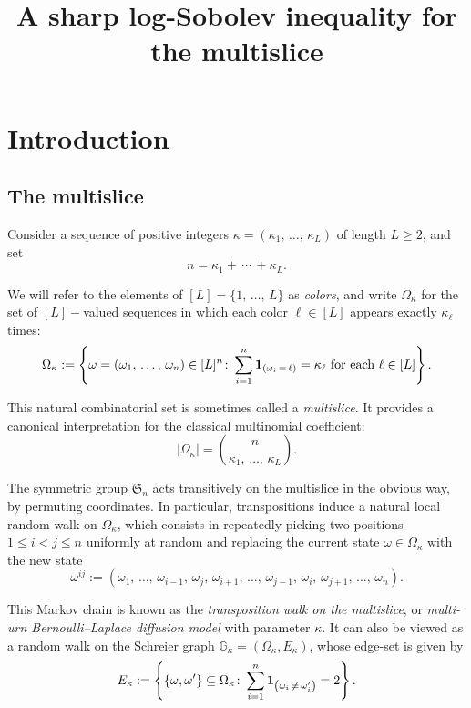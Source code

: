 \documentclass[AHL,Unicode,longabstracts,published]{cedram}
\title[A sharp log-Sobolev inequality for the multislice]{A sharp log-Sobolev inequality for the multislice}
\author[\initial{J.} \lastname{Salez}]{\firstname{Justin} \lastname{Salez}}
\newcommand{\GG}{\mathbb{G}}
\newcommand{\frkS}{\mathfrak{S}}
\newcommand{\bfun}{\bf 1}
\begin{document}
\maketitle

\section{Introduction}
\subsection{The multislice}
Consider a sequence of positive integers $\kappa=(\kappa_1,\,\ldots,\,\kappa_L)$ of length $L\ge 2$, and set
\begin{equation}\label{sum}
n = \kappa_1+\,\cdots\,+\kappa_L.
\end{equation}

We will refer to the elements of $[L]=\{1,\,\ldots,\,L\}$ as \emph{colors}, and write $\Omega_\kappa$ for the set of $[L]-$valued sequences in which each color $\ell\in[L]$ appears exactly $\kappa_\ell$ times:
\[
\Omega_\kappa := \left\{\omega=\left(\omega_1,\,\ldots,\,\omega_n\right)\in[L]^n\colon \sum_{i=1}^n{\bfun}_{(\omega_i\,=\,\ell)} = \kappa_\ell \text{ for each }\ell\in[L] \right\}.
\]

This natural combinatorial set is sometimes called a \emph{multislice}. It provides a canonical interpretation for the classical multinomial coefficient:
\[
\left|\Omega_\kappa\right| = \binom{n}{\kappa_1,\,\ldots,\,\kappa_L}.
\]

The symmetric group $\frkS_n$ acts transitively on the multislice in the obvious way, by permuting coordinates. In particular, transpositions induce a natural local random walk on $\Omega_\kappa$, which consists in repeatedly picking two positions $1\le i<j\le n$ uniformly at random and replacing the current state $\omega\in\Omega_\kappa$ with the new state
\[
\omega^{ij} := \left(\omega_1,\,\ldots,\,\omega_{i-1},\,\omega_j,\,\omega_{i+1},\,\ldots,\,\omega_{j-1},\,\omega_i,\,\omega_{j+1},\,\ldots,\,\omega_n\right).
\]

This Markov chain is known as the \emph{transposition walk on the multislice}, or \emph{multi-urn Bernoulli--Laplace diffusion model} with parameter $\kappa$. It can also be viewed as a random walk on the Schreier graph $\GG_\kappa=(\Omega_\kappa,E_\kappa)$, whose edge-set is given by
\[
E_\kappa := \left\{\left\{\omega,\omega'\right\}\subseteq \Omega_\kappa\colon \sum_{i=1}^n{\bfun}_{\left(\omega_i\,\ne\,\omega_i'\right)}=2\right\}.
\]
\end{document}
